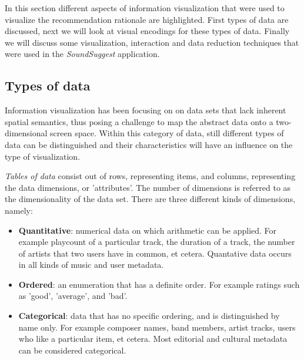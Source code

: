 In this section different aspects of information visualization that were used to visualize the recommendation rationale are highlighted. First types of data are discussed, next we will look at visual encodings for these types of data. Finally we will discuss some visualization, interaction and data reduction techniques that were used in the \emph{SoundSuggest} application.


\subsection{Types of data}\label{chapter:literature_study:section:interaction:subsection:datatypes}


Information visualization has been focusing on on data sets that lack inherent spatial semantics, thus posing a challenge to map the abstract data onto a two-dimensional screen space\cite{keim:2002}. Within this category of data, still different types of data can be distinguished and their characteristics will have an influence on the type of visualization.

\emph{Tables of data} consist out of rows, representing items, and columns, representing the data dimensions, or 'attributes'. The number of dimensions is referred to as the dimensionality of the data set\cite{keim:2002}. There are three different kinds of dimensions, namely\cite{shirley:2009}:

\begin{itemize}
	\item \textbf{Quantitative}: numerical data on which arithmetic can be applied. For example playcount of a particular track, the duration of a track, the number of artists that two users have in common, et cetera. Quantative data occurs in all kinds of music and user metadata.
	\item \textbf{Ordered}: an enumeration that has a definite order. For example ratings such as 'good', 'average', and 'bad'.
	\item \textbf{Categorical}: data that has no specific ordering, and is distinguished by name only. For example composer names, band members, artist tracks, users who like a particular item, et cetera. Most editorial and cultural metadata can be considered categorical.
\end{itemize}

